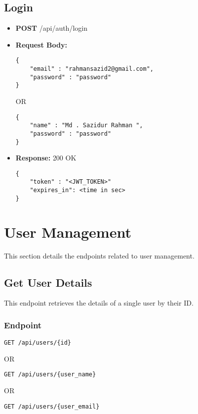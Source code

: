 \documentclass[11pt, a4paper]{article}
\begin{document}
\subsection{\textbf{\large Login}}
\begin{itemize}
    \item \textbf{POST} \colorbox{gray!20}{\tiny /api/auth/login}
    \item \textbf{Request Body:}
        \begin{lstlisting}[style=jsonstyle]
{
    "email" : "rahmansazid2@gmail.com",
    "password" : "password"
}
        \end{lstlisting}
        OR
        \begin{lstlisting}[style=jsonstyle]
{
    "name" : "Md . Sazidur Rahman ",
    "password" : "password"
}
        \end{lstlisting}
    \item \textbf{Response:}  \colorbox{gray!20}{200 OK}
        \begin{lstlisting}[style=jsonstyle]
{
    "token" : "<JWT_TOKEN>"
    "expires_in": <time in sec>
}
        \end{lstlisting}
\end{itemize}


\section{User Management}
This section details the endpoints related to user management.

\subsection{Get User Details}
\label{api:getUserDetails}

This endpoint retrieves the details of a single user by their ID.

\subsubsection*{Endpoint}
\begin{lstlisting}[style=httpstyle, numbers=none]
GET /api/users/{id}
\end{lstlisting}
OR\begin{lstlisting}[style=httpstyle, numbers=none]
GET /api/users/{user_name}
\end{lstlisting}
OR
\begin{lstlisting}[style=httpstyle, numbers=none]
GET /api/users/{user_email}
\end{lstlisting}
\end{document}
